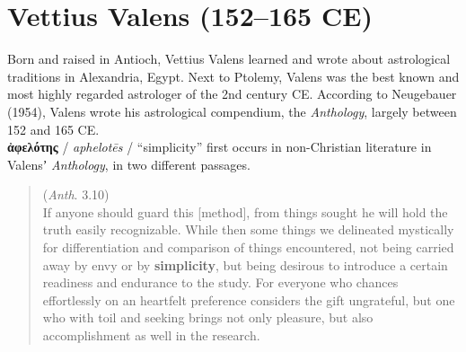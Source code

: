 %
%
\chapter{Vettius Valens (152--165 CE)}
\vspace*{3mm}%
\justifying%
%
\noindent{}Born and raised in Antioch, %
Vettius Valens learned and wrote about astrological traditions in Alexandria, Egypt. %
Next to Ptolemy, Valens was the best known and most highly regarded astrologer of the %
2nd century CE. %
According to Neugebauer (1954), Valens wrote his astrological compendium, %
the \textit{Anthology}, largely between 152 and 165 CE. \\[1.5mm] %

\noindent{}\textbf{ἀφελότης} / \textit{aphelotēs} / “simplicity” first occurs in non-Christian literature %
in Valensʼ \textit{Anthology}, in two different passages. %

\vspace*{3mm} 
 \begin{quote} (\textit{Anth}. 3.10) \\[1mm] %
 If anyone should guard this [method], %
 from things sought he will hold the truth easily recognizable. %
 While then some things we delineated mystically for differentiation and comparison %
 of things encountered, not being carried away by envy or by \textbf{simplicity}, %
 but being desirous to introduce a certain readiness and endurance to the study. %
 For everyone who chances effortlessly on an heartfelt preference considers the gift ungrateful, %
 but one who with toil and seeking brings not only pleasure, %
 but also accomplishment as well in the research. \end{quote} %
 \vspace*{1mm}

